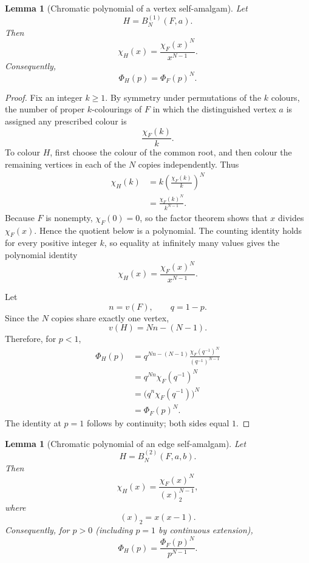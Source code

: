 \documentclass[11pt]{article}
\newtheorem{lemma}[theorem]{Lemma}
\begin{document}
\begin{lemma}[Chromatic polynomial of a vertex self-amalgam]
Let
\[
    H=B_N^{(1)}(F,a).
\]
Then
\[
    \chi_H(x)
    =
    \frac{\chi_F(x)^N}{x^{N-1}}.
\]
Consequently,
\[
    \Phi_H(p)=\Phi_F(p)^N.
\]
\end{lemma}

\begin{proof}
Fix an integer $k\ge1$. By symmetry under permutations of the $k$
colours, the number of proper $k$-colourings of $F$ in which the
distinguished vertex $a$ is assigned any prescribed colour is
\[
    \frac{\chi_F(k)}{k}.
\]
To colour $H$, first choose the colour of the common root, and then
colour the remaining vertices in each of the $N$ copies independently.
Thus
\[
\begin{aligned}
    \chi_H(k)
    &=
    k
    \left(\frac{\chi_F(k)}{k}\right)^N
    \\
    &=
    \frac{\chi_F(k)^N}{k^{N-1}}.
\end{aligned}
\]
Because $F$ is nonempty, $\chi_F(0)=0$, so the factor theorem shows
that $x$ divides $\chi_F(x)$.  Hence the quotient below is a
polynomial.  The counting identity holds for every positive
integer $k$, so equality at infinitely many values gives the polynomial
identity
\[
    \chi_H(x)
    =
    \frac{\chi_F(x)^N}{x^{N-1}}.
\]

Let
\[
    n=v(F),
    \qquad
    q=1-p.
\]
Since the $N$ copies share exactly one vertex,
\[
    v(H)
    =
    Nn-(N-1).
\]
Therefore, for $p<1$,
\[
\begin{aligned}
    \Phi_H(p)
    &=
    q^{Nn-(N-1)}
    \frac{\chi_F(q^{-1})^N}
         {(q^{-1})^{N-1}}
    \\
    &=
    q^{Nn}
    \chi_F(q^{-1})^N
    \\
    &=
    \bigl(q^n\chi_F(q^{-1})\bigr)^N
    \\
    &=
    \Phi_F(p)^N.
\end{aligned}
\]
The identity at $p=1$ follows by continuity; both sides equal $1$.
\end{proof}

\begin{lemma}[Chromatic polynomial of an edge self-amalgam]
Let
\[
    H=B_N^{(2)}(F,a,b).
\]
Then
\[
    \chi_H(x)
    =
    \frac{\chi_F(x)^N}{(x)_2^{N-1}},
\]
where
\[
    (x)_2=x(x-1).
\]
Consequently, for $p>0$ (including $p=1$ by continuous extension),
\[
    \Phi_H(p)
    =
    \frac{\Phi_F(p)^N}{p^{N-1}}.
\]
\end{lemma}
\end{document}
